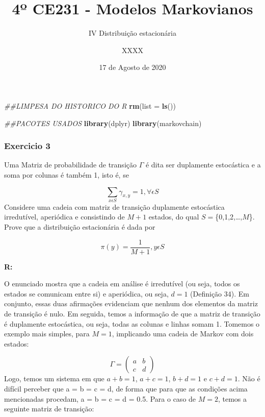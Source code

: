 \documentclass[
]{article}
\title{4º CE231 - Modelos Markovianos}
\subtitle{IV Distribuição estacionária}
\author{XXXX}
\date{17 de Agosto de 2020}
\newenvironment{Shaded}{\begin{snugshade}}{\end{snugshade}}
\newcommand{\CommentTok}[1]{\textcolor[rgb]{0.56,0.35,0.01}{\textit{#1}}}
\newcommand{\DataTypeTok}[1]{\textcolor[rgb]{0.13,0.29,0.53}{#1}}
\newcommand{\KeywordTok}[1]{\textcolor[rgb]{0.13,0.29,0.53}{\textbf{#1}}}
\newcommand{\NormalTok}[1]{#1}
\begin{document}
\maketitle

\begin{Shaded}
\begin{Highlighting}[]
\CommentTok{##LIMPESA DO HISTORICO DO R}
\KeywordTok{rm}\NormalTok{(}\DataTypeTok{list =} \KeywordTok{ls}\NormalTok{())}

\CommentTok{##PACOTES USADOS}
\KeywordTok{library}\NormalTok{(dplyr)}
\KeywordTok{library}\NormalTok{(markovchain)}
\end{Highlighting}
\end{Shaded}

\hypertarget{exercicio-3}{%
\subsubsection{Exercicio 3}\label{exercicio-3}}

Uma Matriz de probabilidade de transição \(\Gamma\) é dita ser
duplamente estocástica e a soma por colunas é também 1, isto é, se

\[\sum_{x\epsilon S} \gamma_{x,y}=1,\forall\epsilon S\] Considere uma
cadeia com matriz de transição duplamente estocástica irredutível,
aperiódica e consistindo de \(M +1\) estados, do qual
\(S=\)\{0,1,2,\ldots,\(M\)\}. Prove que a distribuição estacionária é
dada por

\[\pi(y)=\frac{1}{M+1},y\epsilon S\]

\textbf{R:}

O enunciado mostra que a cadeia em análise é irredutível (ou seja, todos
os estados se comunicam entre si) e aperiódica, ou seja, \(d=1\)
(Definição 34). Em conjunto, essas duas afirmações evidenciam que nenhum
dos elementos da matriz de transição é nulo. Em seguida, temos a
informação de que a matriz de transição é duplamente estocástica, ou
seja, todas as colunas e linhas somam 1. Tomemos o exemplo mais simples,
para \(M = 1\), implicando uma cadeia de Markov com dois estados:

\[\Gamma = 
\begin{pmatrix}
a & b \\
c & d    
\end{pmatrix}\] Logo, temos um sistema em que \(a + b = 1\),
\(a + c = 1\), \(b + d = 1\) e \(c + d = 1\). Não é difícil perceber que
a = b = c = d, de forma que para que as condições acima mencionadas
procedam, a = b = c = d = 0.5. Para o caso de \(M = 2\), temos a
seguinte matriz de transição:
\end{document}

